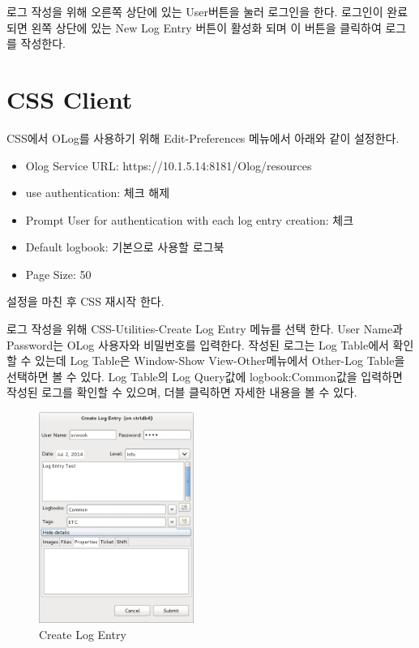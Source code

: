 \documentclass[11pt
  , a4paper
  , article
  , oneside
]{memoir}
\begin{document}
로그 작성을 위해 오른쪽 상단에 있는 User버튼을 눌러 로그인을 한다. 로그인이 완료되면 왼쪽 상단에 있는
New Log Entry 버튼이 활성화 되며 이 버튼을 클릭하여 로그를 작성한다.

\section{CSS Client}
CSS에서 OLog를 사용하기 위해 Edit-Preferences 메뉴에서 아래와 같이 설정한다.
\begin{itemize}
\item Olog Service URL: https://10.1.5.14:8181/Olog/resources
\item use authentication: 체크 해제
\item Prompt User for authentication with each log entry creation: 체크
\item Default logbook: 기본으로 사용할 로그북
\item Page Size: 50
\end{itemize}
설정을 마친 후 CSS 재시작 한다.

로그 작성을 위해 CSS-Utilities-Create Log Entry 메뉴를 선택 한다.
User Name과 Password는 OLog 사용자와 비밀번호를 입력한다.
작성된 로그는 Log Table에서 확인 할 수 있는데
Log Table은 Window-Show View-Other메뉴에서  Other-Log Table을 선택하면 볼 수 있다.
Log Table의 Log Query값에 logbook:Common값을 입력하면 작성된 로그를 확인할 수 있으며,
더블 클릭하면 자세한 내용을 볼 수 있다. 
\begin{figure}[!htb]
  \centering
  \includegraphics[width=0.45\textwidth]{./images/CSS_Log_Entry.png}
  \caption{
            Create Log Entry
          }
  \label{fig:css_log_entry}
\end{figure}

\newpage
\end{document}
